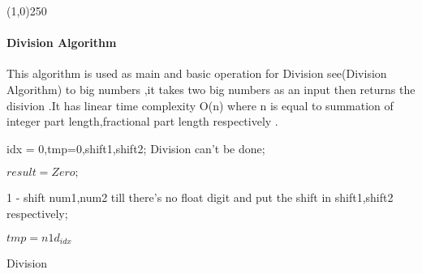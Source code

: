 \newpage
\begin{center}
	\line(1,0){250}
\end{center}

\paragraph{Division Algorithm}
This algorithm is used as main and basic operation for Division see(Division Algorithm) to big numbers ,it takes two big numbers as an input then returns the disivion .It has linear time complexity O(n) where n is equal to summation of integer part length,fractional part length respectively .
\newline\newline\newline\newline\newline\newline\newline\newline\newline


\begin{algorithm}[H]
	\SetAlgoLined
	idx = 0,tmp=0,shift1,shift2;
	{
		Division can't be done;
	}
	{
		{
			$result = Zero;$
		}
		{
			1 - shift num1,num2 till there's no float digit and put the shift in shift1,shift2 respectively;
		
			$tmp  = n1d_{idx}$

			
				
				
			
		
		}	

	}
	

	\caption{Division}
	\label{division_algorithm}
\end{algorithm}


